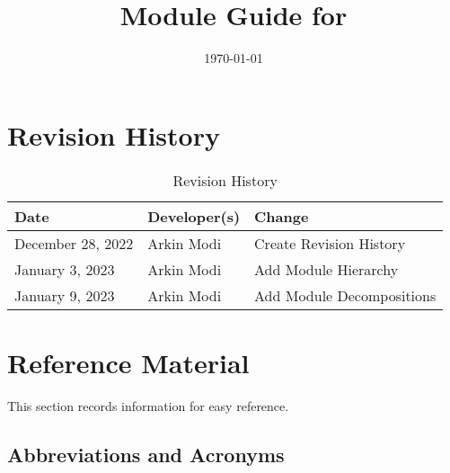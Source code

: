 \documentclass[12pt, titlepage]{article}
\begin{document}
\title{Module Guide for \progname{}}
\author{\authname}
\date{\today}

\maketitle


\section{Revision History}

\begin{table}[hp]
	\caption{Revision History} \label{TblRevisionHistory}
	\begin{tabularx}{\textwidth}{llX}
		\toprule
		\textbf{Date}     & \textbf{Developer(s)} & \textbf{Change}           \\
		\midrule
		December 28, 2022 & Arkin Modi            & Create Revision History   \\
		January 3, 2023   & Arkin Modi            & Add Module Hierarchy      \\
		January 9, 2023   & Arkin Modi            & Add Module Decompositions \\
		\bottomrule
	\end{tabularx}
\end{table}

\newpage

\section{Reference Material}

This section records information for easy reference.

\subsection{Abbreviations and Acronyms}
\end{document}
